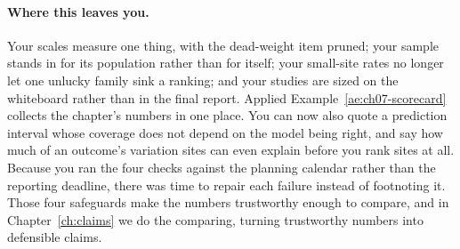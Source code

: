 \documentclass[
    a4paper,
    fontsize=10pt,
    twoside=true,
    numbers=noenddot,
]{kaobook}
\begin{document}
\paragraph{Where this leaves you.} Your scales measure one thing, with the dead-weight item pruned; your sample stands in for its population rather than for itself; your small-site rates no longer let one unlucky family sink a ranking; and your studies are sized on the whiteboard rather than in the final report. Applied Example~\ref{ae:ch07-scorecard} collects the chapter's numbers in one place. You can now also quote a prediction interval whose coverage does not depend on the model being right, and say how much of an outcome's variation sites can even explain before you rank sites at all. Because you ran the four checks against the planning calendar rather than the reporting deadline, there was time to repair each failure instead of footnoting it. Those four safeguards make the numbers trustworthy enough to compare, and in Chapter~\ref{ch:claims} we do the comparing, turning trustworthy numbers into defensible claims.
\end{document}

